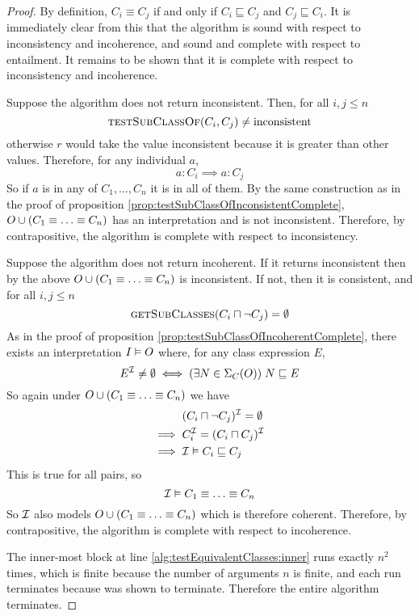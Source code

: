 \documentclass[paper.tex]{subfiles}
\begin{document}
\begin{proof}
  By definition, $C_i \equiv C_j$ if and only if $C_i \sqsubseteq C_j$ and $C_j \sqsubseteq C_i$.  It is immediately clear from this that the algorithm is sound with respect to inconsistency and incoherence, and sound and complete with respect to entailment.  It remains to be shown that it is complete with respect to inconsistency and incoherence.

  Suppose the algorithm does not return inconsistent.  Then, for all $i,j \le n$
  \[ \Call{testSubClassOf}{C_i, C_j} \ne \mathrm{inconsistent} \]
  otherwise $r$ would take the value inconsistent because it is greater than other values.
  Therefore, for any individual $a$,
  \[ a : C_i \implies a : C_j \]
  So if $a$ is in any of $C_1, \ldots, C_n$ it is in all of them.  By the same construction as in the proof of proposition \ref{prop:testSubClassOfInconsistentComplete}, $O \cup (C_1 \equiv \ldots \equiv C_n)$ has an interpretation and is not inconsistent.  Therefore, by contrapositive, the algorithm is complete with respect to inconsistency.

  Suppose the algorithm does not return incoherent.  If it returns inconsistent then by the above $O \cup (C_1 \equiv \ldots \equiv C_n)$ is inconsistent.  If not, then it is consistent, and for all $i,j \le n$
  \[ \Call{getSubClasses}{C_i \sqcap \neg C_j} = \emptyset \]
  As in the proof of proposition \ref{prop:testSubClassOfIncoherentComplete}, there exists an interpretation $I \vDash O$ where, for any class expression $E$,
  \[ E^{\mathcal{I}} \ne \emptyset \iff (\exists N \in \Sigma_C(O)) \; N \sqsubseteq E \]
  So again under $O \cup (C_1 \equiv \ldots \equiv C_n)$ we have
  \begin{align*}
    & (C_i \sqcap \neg C_j)^{\mathcal{I}} = \emptyset \\
    \implies{}& C_i^{\mathcal{I}} = (C_i \sqcap C_j)^{\mathcal{I}} \\
    \implies{}& \mathcal{I} \vDash C_i \sqsubseteq C_j
  \end{align*}
  This is true for all pairs, so
  \[ \mathcal{I} \vDash C_1 \equiv \ldots \equiv C_n \]
  So $\mathcal{I}$ also models $O \cup (C_1 \equiv \ldots \equiv C_n)$ which is therefore coherent.  Therefore, by contrapositive, the algorithm is complete with respect to incoherence.

  The inner-most block at line \ref{alg:testEquivalentClasses:inner} runs exactly $n^2$ times, which is finite because the number of arguments $n$ is finite, and each run terminates because  was shown to terminate.  Therefore the entire algorithm terminates.
\end{proof}
\end{document}
